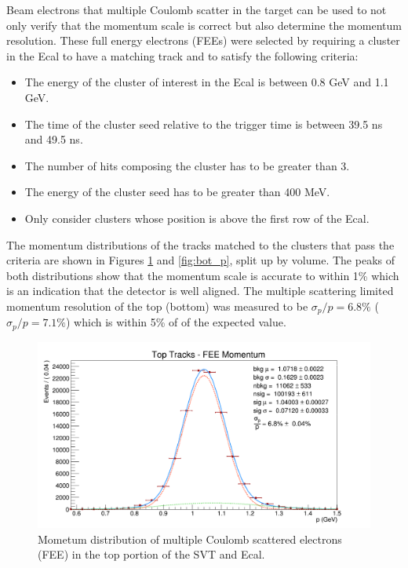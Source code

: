 Beam electrons that multiple Coulomb scatter in the target can be used to 
not only verify that the momentum scale is correct but also determine the 
momentum resolution.  These full energy electrons (FEEs) 
were selected by requiring a cluster in the Ecal to have a matching track and
to satisfy the following criteria:
\begin{itemize}
    \item The energy of the cluster of interest in the Ecal  is between 0.8 GeV
          and 1.1 GeV.
    \item The time of the cluster seed relative to the trigger time is between
          39.5 ns and 49.5 ns.
    \item The number of hits composing the cluster has to be greater than 3.
    \item The energy of the cluster seed has to be greater than 400 MeV.
    \item Only consider clusters whose position is above the first row of the 
          Ecal.
\end{itemize}
The momentum distributions of the tracks matched to the clusters that pass the
criteria are shown in Figures \ref{fig:top_p} and \ref{fig:bot_p}, split up by volume.  The peaks
of both distributions show that the momentum scale is accurate to within 1\% 
which is an indication that the detector is well aligned.  The 
multiple scattering limited momentum resolution of the top (bottom) was measured
to be $\sigma_{p}/p = 6.8\%$ ($\sigma_{p}/p = 7.1\%$) which 
is within 5\% of of the expected value.
\begin{figure}[h!t]
    \centering
    \includegraphics[width=.95\textwidth]{images/20160424_fee_top_tracks_p.png}
    \caption{Mometum distribution of multiple Coulomb scattered electrons (FEE) in
             the top portion of the SVT and Ecal.}
    \label{fig:top_p}
\end{figure}
